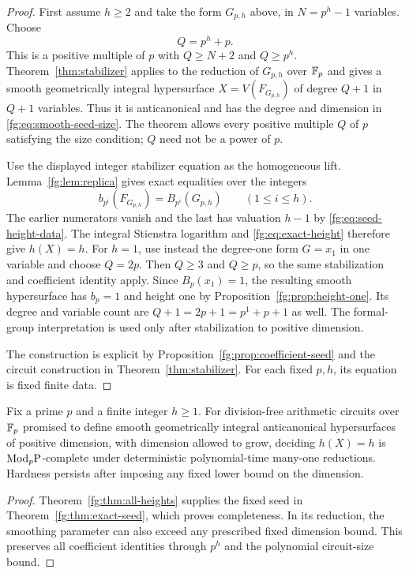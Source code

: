 \begin{proof}
First assume $h\ge2$ and take the form $G_{p,h}$ above, in
$N=p^h-1$ variables. Choose
\[
 Q=p^h+p.
\]
This is a positive multiple of $p$ with
$Q\ge N+2$ and $Q\ge p^h$. Theorem~\ref{thm:stabilizer} applies to
the reduction of $G_{p,h}$ over $\mathbb F_p$ and gives a smooth
geometrically integral hypersurface $X=V(F_{G_{p,h}})$ of degree
$Q+1$ in $Q+1$ variables. Thus it is anticanonical and has the
degree and dimension in \eqref{fg:eq:smooth-seed-size}.
The theorem allows every positive multiple $Q$ of $p$ satisfying
the size condition; $Q$ need not be a power of $p$.

Use the displayed integer stabilizer equation as the homogeneous
lift. Lemma~\ref{fg:lem:replica} gives exact equalities over the
integers
\[
 b_{p^i}(F_{G_{p,h}})=B_{p^i}(G_{p,h})
 \qquad(1\le i\le h).
\]
The earlier numerators vanish and the last has valuation $h-1$ by
\eqref{fg:eq:seed-height-data}. The integral Stienstra logarithm
and \eqref{fg:eq:exact-height} therefore give $h(X)=h$.
For $h=1$, use instead the degree-one form $G=x_1$ in one
variable and choose $Q=2p$. Then $Q\ge3$ and $Q\ge p$, so the
same stabilization and coefficient identity apply. Since
$B_p(x_1)=1$, the resulting smooth hypersurface has $b_p=1$ and
height one by Proposition~\ref{fg:prop:height-one}. Its degree and
variable count are $Q+1=2p+1=p^1+p+1$ as well. The formal-group
interpretation is used only after stabilization to positive dimension.

The construction is explicit by Proposition~\ref{fg:prop:coefficient-seed}
and the circuit construction in Theorem~\ref{thm:stabilizer}.
For each fixed $p,h$, its equation is fixed finite data.
\end{proof}

\begin{corollary}
\label{fg:cor:exact-height-complete}
Fix a prime $p$ and a finite integer $h\ge1$.
For division-free arithmetic circuits over $\mathbb F_p$ promised to define
smooth geometrically integral anticanonical hypersurfaces of positive
dimension, with dimension allowed to grow, deciding $h(X)=h$ is
$\mathrm{Mod}_p\mathrm P$-complete under deterministic polynomial-time many-one
reductions. Hardness persists after imposing any fixed lower bound
on the dimension.
\end{corollary}

\begin{proof}
Theorem~\ref{fg:thm:all-heights} supplies the fixed seed in
Theorem~\ref{fg:thm:exact-seed}, which proves completeness.
In its reduction, the smoothing parameter can also exceed any
prescribed fixed dimension bound. This preserves all coefficient
identities through $p^h$ and the polynomial circuit-size bound.
\end{proof}

